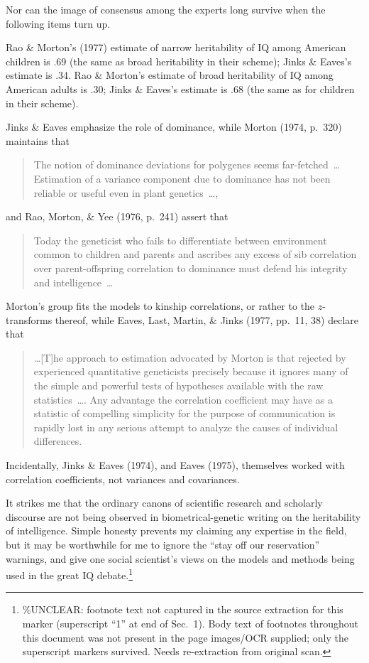 ﻿\documentclass[12pt]{article}
\begin{document}
Nor can the image of consensus among the experts long survive when the following items turn up.

Rao \& Morton's (1977) estimate of narrow heritability of IQ among American children is .69 (the same as broad heritability in their scheme); Jinks \& Eaves's estimate is .34. Rao \& Morton's estimate of broad heritability of IQ among American adults is .30; Jinks \& Eaves's estimate is .68 (the same as for children in their scheme).

Jinks \& Eaves emphasize the role of dominance, while Morton (1974, p.\ 320) maintains that

\begin{quote}
The notion of dominance deviations for polygenes seems far-fetched~\ldots Estimation of a variance component due to dominance has not been reliable or useful even in plant genetics~\ldots,
\end{quote}

and Rao, Morton, \& Yee (1976, p.\ 241) assert that

\begin{quote}
Today the geneticist who fails to differentiate between environment common to children and parents and ascribes any excess of sib correlation over parent-offspring correlation to dominance must defend his integrity and intelligence~\ldots
\end{quote}

Morton's group fits the models to kinship correlations, or rather to the $z$-transforms thereof, while Eaves, Last, Martin, \& Jinks (1977, pp.\ 11, 38) declare that

\begin{quote}
\ldots [T]he approach to estimation advocated by Morton is that rejected by experienced quantitative geneticists precisely because it ignores many of the simple and powerful tests of hypotheses available with the raw statistics~\ldots. Any advantage the correlation coefficient may have as a statistic of compelling simplicity for the purpose of communication is rapidly lost in any serious attempt to analyze the causes of individual differences.
\end{quote}

Incidentally, Jinks \& Eaves (1974), and Eaves (1975), themselves worked with correlation coefficients, not variances and covariances.

It strikes me that the ordinary canons of scientific research and scholarly discourse are not being observed in biometrical-genetic writing on the heritability of intelligence. Simple honesty prevents my claiming any expertise in the field, but it may be worthwhile for me to ignore the ``stay off our reservation'' warnings, and give one social scientist's views on the models and methods being used in the great IQ debate.\footnote{\%UNCLEAR: footnote text not captured in the source extraction for this marker (superscript ``1'' at end of Sec.\ 1). Body text of footnotes throughout this document was not present in the page images/OCR supplied; only the superscript markers survived. Needs re-extraction from original scan.}
\end{document}
